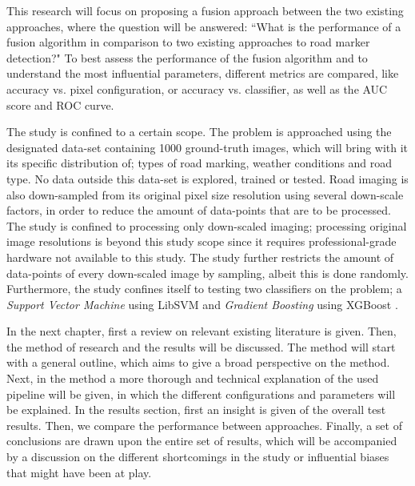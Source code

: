 This research will focus on proposing a fusion approach between the two existing approaches, where the question will be answered: ``What is the performance of a fusion algorithm in comparison to two existing approaches to road marker detection?" To best assess the performance of the fusion algorithm and to understand the most influential parameters, different metrics are compared, like accuracy vs. pixel configuration, or accuracy vs. classifier, as well as the AUC score and ROC curve.

The study is confined to a certain scope. The problem is approached using the designated data-set containing 1000 ground-truth images, which will bring with it its specific distribution of; types of road marking, weather conditions and road type. No data outside this data-set is explored, trained or tested. Road imaging is also down-sampled from its original pixel size resolution using several down-scale factors, in order to reduce the amount of data-points that are to be processed. The study is confined to processing only down-scaled imaging; processing original image resolutions is beyond this study scope since it requires professional-grade hardware not available to this study. The study further restricts the amount of data-points of every down-scaled image by sampling, albeit this is done randomly. Furthermore, the study confines itself to testing two classifiers on the problem; a \textit{Support Vector Machine} using LibSVM \citep{chang2011libsvm} and \textit{Gradient Boosting} using XGBoost \citep{chen2016xgboost}. 

In the next chapter, first a review on relevant existing literature is given. Then, the method of research and the results will be discussed. The method will start with a general outline, which aims to give a broad perspective on the method. Next, in the method a more thorough and technical explanation of the used pipeline will be given, in which the different configurations and parameters will be explained. In the results section, first an insight is given of the overall test results. Then, we compare the performance between approaches. Finally, a set of conclusions are drawn upon the entire set of results, which will be accompanied by a discussion on the different shortcomings in the study or influential biases that might have been at play.
